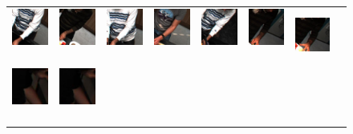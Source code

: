 \documentclass[runningheads]{llncs}
\begin{document}
\begin{figure}[t]
\begin{center}
\begin{tabular}{@{}c@{}c@{}c@{}c@{}c@{}c@{}c@{}c@{}}
\includegraphics[height=0.10\linewidth]{figures/biposelets/poselet-230/sample-1-f0.jpg}\,&
\includegraphics[height=0.10\linewidth]{figures/biposelets/poselet-230/sample-2-f0.jpg}\,&
\includegraphics[height=0.10\linewidth]{figures/biposelets/poselet-230/sample-3-f0.jpg}\,&
\includegraphics[height=0.10\linewidth]{figures/biposelets/poselet-230/sample-4-f0.jpg}\,&
\includegraphics[height=0.10\linewidth]{figures/biposelets/poselet-230/sample-5-f0.jpg}\,&
\includegraphics[height=0.10\linewidth]{figures/biposelets/poselet-230/sample-6-f0.jpg}\,&
\includegraphics[height=0.10\linewidth]{figures/biposelets/poselet-230/sample-7-f0.jpg}\\
%
\includegraphics[height=0.10\linewidth]{figures/biposelets/poselet-289/sample-1-f0.jpg}\,&
\includegraphics[height=0.10\linewidth]{figures/biposelets/poselet-289/sample-2-f0.jpg}\,&

\end{tabular}
\end{center}
\end{figure}
\end{document}
